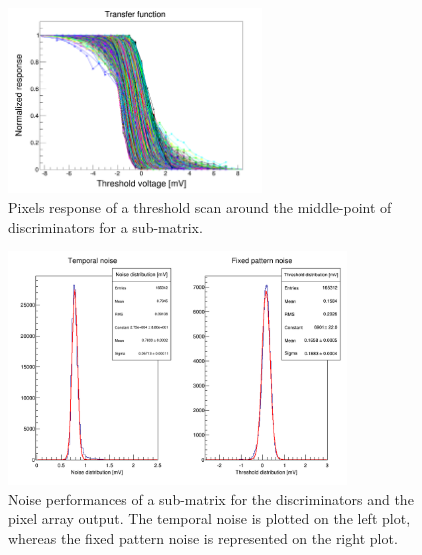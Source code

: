   
  \begin{figure}[!h]
    \centering
    \includegraphics[width=0.6\textwidth]{Pictures/labTests/transfer_B.png}
    \caption{Pixels response of a threshold scan around the middle-point of discriminators for a sub-matrix.}
    \label{fig:transfer}
  \end{figure}

  \begin{figure}[!h]
    \centering
    \includegraphics[width=0.8\textwidth]{Pictures/labTests/noise_A.png}
    \caption{Noise performances of a sub-matrix for the discriminators and the pixel array output. The temporal noise is plotted on the left plot, whereas the fixed pattern noise is represented on the right plot.} 
    \label{fig:TN&FPN}
  \end{figure}

